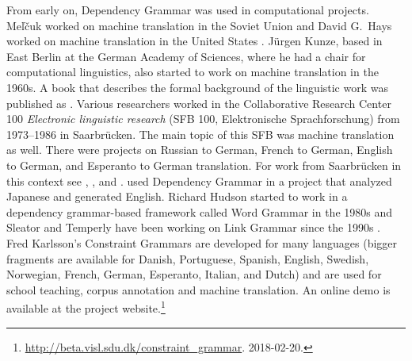 From early on, Dependency Grammar was used in computational projects. Meľčuk worked on machine
translation in the Soviet Union \citep{Melcuk64a-u} and David G.\ Hays worked on machine translation
in the United States \citep{HZ60a-u}. Jürgen Kunze, based in East Berlin at the German Academy of
Sciences, where he had a chair for computational linguistics, also started to work on machine
translation in the 1960s. A book that describes the formal background of the linguistic work was
published as .  Various researchers worked in the Collaborative Research Center
100 \emph{Electronic linguistic research} (SFB 100, Elektronische Sprachforschung) from 1973--1986
in Saarbrücken. The main topic of this SFB was machine translation as well. There were projects on
Russian to German, French to German, English to German, and
Esperanto to German translation. For work from Saarbrücken in
this context see , , and .
\citet{MIF85a} used Dependency Grammar in a project that analyzed Japanese and
generated English.
Richard Hudson started to work in a dependency grammar-based framework called Word Grammar\indexwg
in the 1980s \citep{Hudson84a-u,Hudson2007a-u} and Sleator and Temperly have been working on Link
Grammar since the 1990s \citep{ST91a-u,GLS95a-u}.
Fred Karlsson's Constraint Grammars \citeyearpar{Karlsson90a-u} are developed for many languages (bigger fragments are available
for Danish, Portuguese, Spanish, English, Swedish, Norwegian, French, German, Esperanto, Italian, and
Dutch) and are used for school teaching,
corpus annotation and machine translation. An online
demo is available at the project website.\footnote{%
  \url{http://beta.visl.sdu.dk/constraint_grammar}. 2018-02-20.
}






%


